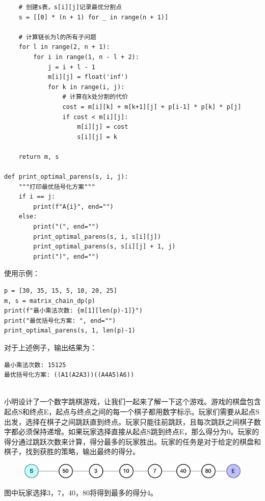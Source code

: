 \documentclass[12pt,twoside]{article}
\begin{document}
\begin{problems}
\begin{verbatim}
    # 创建s表，s[i][j]记录最优分割点
    s = [[0] * (n + 1) for _ in range(n + 1)]
    
    # 计算链长为l的所有子问题
    for l in range(2, n + 1):
        for i in range(1, n - l + 2):
            j = i + l - 1
            m[i][j] = float('inf')
            for k in range(i, j):
                # 计算在k处分割的代价
                cost = m[i][k] + m[k+1][j] + p[i-1] * p[k] * p[j]
                if cost < m[i][j]:
                    m[i][j] = cost
                    s[i][j] = k
    
    return m, s

def print_optimal_parens(s, i, j):
    """打印最优括号化方案"""
    if i == j:
        print(f"A{i}", end="")
    else:
        print("(", end="")
        print_optimal_parens(s, i, s[i][j])
        print_optimal_parens(s, s[i][j] + 1, j)
        print(")", end="")
\end{verbatim}

使用示例：

\begin{verbatim}
p = [30, 35, 15, 5, 10, 20, 25]
m, s = matrix_chain_dp(p)
print(f"最小乘法次数: {m[1][len(p)-1]}")
print("最优括号化方案: ", end="")
print_optimal_parens(s, 1, len(p)-1)
\end{verbatim}

对于上述例子，输出结果为：

\begin{verbatim}
最小乘法次数: 15125
最优括号化方案: ((A1(A2A3))((A4A5)A6))
\end{verbatim}

\eparts

\\
小明设计了一个数字跳棋游戏，让我们一起来了解一下这个游戏。游戏的棋盘包含起点S和终点E，起点与终点之间的每一个棋子都用数字标示。玩家们需要从起点S出发，选择在棋子之间跳跃直到终点。玩家只能往前跳跃，且每次跳跃之间棋子数字都必须保持递增。如果玩家选择直接从起点S跳到终点E，那么得分为0。玩家的得分通过跳跃次数来计算，得分最多的玩家胜出。玩家的任务是对于给定的棋盘和棋子，找到获胜的策略，输出最终的得分。
\begin{figure}[h]
\centering
\includegraphics[scale=0.55]{fig/LIS_1.png}
\end{figure}\label{fig:LIS1}

图中玩家选择3，7，40，80将得到最多的得分4。


\end{problems}
\end{document}
